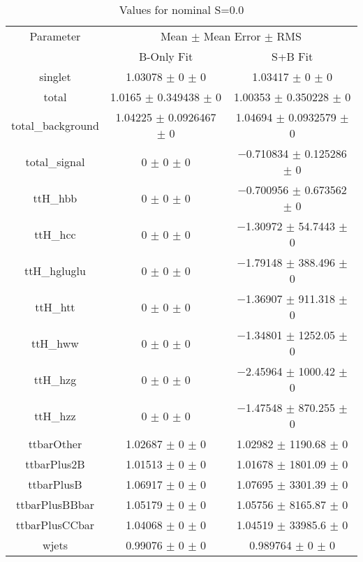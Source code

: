 \begin{table}
\centering
\caption{Values for nominal S=0.0}
\begin{tabular}{ccc}
\toprule
Parameter & \multicolumn{2}{c}{Mean $\pm$ Mean Error $\pm$ RMS}\\
 & B-Only Fit & S+B Fit\\
\midrule
singlet & \num{1.03078} $\pm$ \num{0} $\pm$ \num{0} & \num{1.03417} $\pm$ \num{0} $\pm$ \num{0}\\
total & \num{1.0165} $\pm$ \num{0.349438} $\pm$ \num{0} & \num{1.00353} $\pm$ \num{0.350228} $\pm$ \num{0}\\
total\_background & \num{1.04225} $\pm$ \num{0.0926467} $\pm$ \num{0} & \num{1.04694} $\pm$ \num{0.0932579} $\pm$ \num{0}\\
total\_signal & \num{0} $\pm$ \num{0} $\pm$ \num{0} & \num{-0.710834} $\pm$ \num{0.125286} $\pm$ \num{0}\\
ttH\_hbb & \num{0} $\pm$ \num{0} $\pm$ \num{0} & \num{-0.700956} $\pm$ \num{0.673562} $\pm$ \num{0}\\
ttH\_hcc & \num{0} $\pm$ \num{0} $\pm$ \num{0} & \num{-1.30972} $\pm$ \num{54.7443} $\pm$ \num{0}\\
ttH\_hgluglu & \num{0} $\pm$ \num{0} $\pm$ \num{0} & \num{-1.79148} $\pm$ \num{388.496} $\pm$ \num{0}\\
ttH\_htt & \num{0} $\pm$ \num{0} $\pm$ \num{0} & \num{-1.36907} $\pm$ \num{911.318} $\pm$ \num{0}\\
ttH\_hww & \num{0} $\pm$ \num{0} $\pm$ \num{0} & \num{-1.34801} $\pm$ \num{1252.05} $\pm$ \num{0}\\
ttH\_hzg & \num{0} $\pm$ \num{0} $\pm$ \num{0} & \num{-2.45964} $\pm$ \num{1000.42} $\pm$ \num{0}\\
ttH\_hzz & \num{0} $\pm$ \num{0} $\pm$ \num{0} & \num{-1.47548} $\pm$ \num{870.255} $\pm$ \num{0}\\
ttbarOther & \num{1.02687} $\pm$ \num{0} $\pm$ \num{0} & \num{1.02982} $\pm$ \num{1190.68} $\pm$ \num{0}\\
ttbarPlus2B & \num{1.01513} $\pm$ \num{0} $\pm$ \num{0} & \num{1.01678} $\pm$ \num{1801.09} $\pm$ \num{0}\\
ttbarPlusB & \num{1.06917} $\pm$ \num{0} $\pm$ \num{0} & \num{1.07695} $\pm$ \num{3301.39} $\pm$ \num{0}\\
ttbarPlusBBbar & \num{1.05179} $\pm$ \num{0} $\pm$ \num{0} & \num{1.05756} $\pm$ \num{8165.87} $\pm$ \num{0}\\
ttbarPlusCCbar & \num{1.04068} $\pm$ \num{0} $\pm$ \num{0} & \num{1.04519} $\pm$ \num{33985.6} $\pm$ \num{0}\\
wjets & \num{0.99076} $\pm$ \num{0} $\pm$ \num{0} & \num{0.989764} $\pm$ \num{0} $\pm$ \num{0}\\
\bottomrule
\end{tabular}
\end{table}